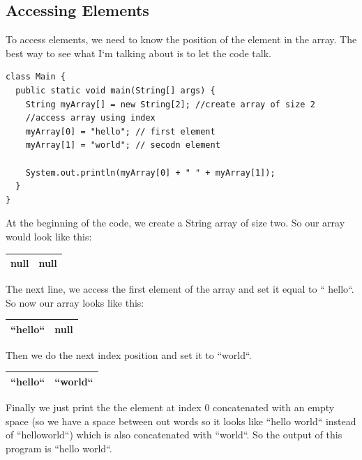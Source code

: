 \documentclass[11]{article}
\begin{document}
\subsection{Accessing Elements}
To access elements, we need to know the position of the element in the array. The best way to see what I`m talking about is to let the code talk.

\begin{lstlisting}
class Main {
  public static void main(String[] args) {
    String myArray[] = new String[2]; //create array of size 2
    //access array using index
    myArray[0] = "hello"; // first element
    myArray[1] = "world"; // secodn element

    System.out.println(myArray[0] + " " + myArray[1]);
  }
}
\end{lstlisting}

At the beginning of the code, we create a String array of size two. So our array would look like this:
\begin{center}
	\begin{tabular}{ | c | c | } \hline
 	null & null  \\   \hline
	\end{tabular}
\end{center}

The next line, we access the first element of the array and set it equal to `` hello``. So now our array looks like this:

\begin{center}
	\begin{tabular}{ | c | c | } \hline
 	``hello`` & null  \\   \hline
	\end{tabular}
\end{center}

Then we do the next index position and set it to ``world``. 

\begin{center}
	\begin{tabular}{ | c | c | } \hline
 	``hello`` & ``world``  \\   \hline
	\end{tabular}
\end{center}

Finally we just print the the element at index $0$ concatenated with an empty space (so we have a space between out words so it looks like ``hello world`` instead of ``helloworld``) which is also concatenated with ``world``. So the output of this program is ``hello world``.	
\end{document}
